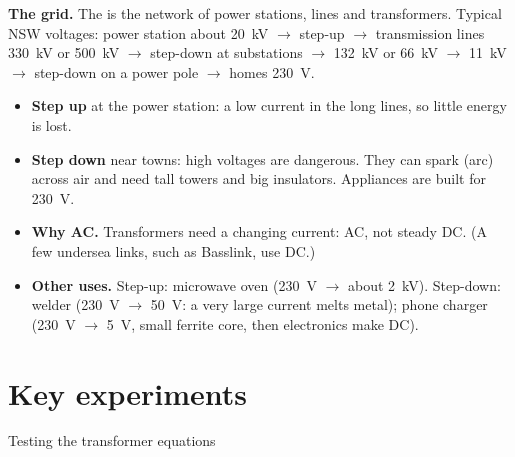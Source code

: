 \textbf{The grid.} The  is the network of power stations, lines and transformers.
Typical NSW voltages: power station about \qty{20}{kV} $\to$ step-up $\to$ transmission
lines \qty{330}{kV} or \qty{500}{kV} $\to$ step-down at substations $\to$ \qty{132}{kV} or
\qty{66}{kV} $\to$ \qty{11}{kV} $\to$ step-down on a power pole $\to$ homes \qty{230}{V}.
\begin{itemize}
  \item \textbf{Step up} at the power station: a low current in the long lines, so little
        energy is lost.
  \item \textbf{Step down} near towns: high voltages are dangerous. They can spark (arc)
        across air and need tall towers and big insulators. Appliances are built for
        \qty{230}{V}.
  \item \textbf{Why AC.} Transformers need a changing current: AC, not steady DC. (A few
        undersea links, such as Basslink, use DC.)
  \item \textbf{Other uses.} Step-up: microwave oven (\qty{230}{V} $\to$ about \qty{2}{kV}).
        Step-down: welder (\qty{230}{V} $\to$ \qty{50}{V}: a very large current melts
        metal); phone charger (\qty{230}{V} $\to$ \qty{5}{V}, small ferrite core, then
        electronics make DC).
\end{itemize}


\section{Key experiments}\label{ch4:sec:experiments}

\begin{experiment}{Testing the transformer equations}
\end{experiment}

